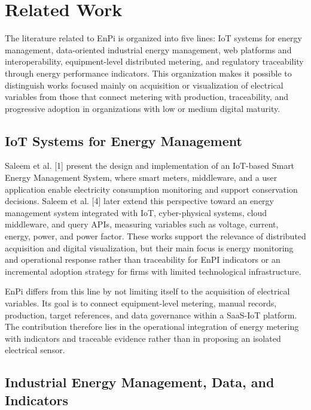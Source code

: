 \documentclass{ieeeaccess}
\begin{document}
\section{Related Work}
\label{sec:related-work}

The literature related to EnPi is organized into five lines: IoT systems for energy management, data-oriented industrial energy management, web platforms and interoperability, equipment-level distributed metering, and regulatory traceability through energy performance indicators. This organization makes it possible to distinguish works focused mainly on acquisition or visualization of electrical variables from those that connect metering with production, traceability, and progressive adoption in organizations with low or medium digital maturity.

\subsection{IoT Systems for Energy Management}
\label{subsec:iot-systems-energy-management}

Saleem et al. [1] present the design and implementation of an IoT-based Smart Energy Management System, where smart meters, middleware, and a user application enable electricity consumption monitoring and support conservation decisions. Saleem et al. [4] later extend this perspective toward an energy management system integrated with IoT, cyber-physical systems, cloud middleware, and query APIs, measuring variables such as voltage, current, energy, power, and power factor. These works support the relevance of distributed acquisition and digital visualization, but their main focus is energy monitoring and operational response rather than traceability for EnPI indicators or an incremental adoption strategy for firms with limited technological infrastructure.

EnPi differs from this line by not limiting itself to the acquisition of electrical variables. Its goal is to connect equipment-level metering, manual records, production, target references, and data governance within a SaaS-IoT platform. The contribution therefore lies in the operational integration of energy metering with indicators and traceable evidence rather than in proposing an isolated electrical sensor.

\subsection{Industrial Energy Management, Data, and Indicators}
\label{subsec:industrial-energy-management}
\end{document}
